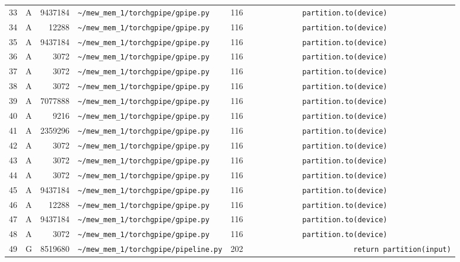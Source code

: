 \documentclass{article}
\begin{document}
\begin{longtable}{r l r p{6.5cm} r p{7.0cm}}
33 & A & 9437184 & \lstinline|~/mew_mem_1/torchgpipe/gpipe.py| & 116 & \lstinline|            partition.to(device)| \\
34 & A & 12288 & \lstinline|~/mew_mem_1/torchgpipe/gpipe.py| & 116 & \lstinline|            partition.to(device)| \\
35 & A & 9437184 & \lstinline|~/mew_mem_1/torchgpipe/gpipe.py| & 116 & \lstinline|            partition.to(device)| \\
36 & A & 3072 & \lstinline|~/mew_mem_1/torchgpipe/gpipe.py| & 116 & \lstinline|            partition.to(device)| \\
37 & A & 3072 & \lstinline|~/mew_mem_1/torchgpipe/gpipe.py| & 116 & \lstinline|            partition.to(device)| \\
38 & A & 3072 & \lstinline|~/mew_mem_1/torchgpipe/gpipe.py| & 116 & \lstinline|            partition.to(device)| \\
39 & A & 7077888 & \lstinline|~/mew_mem_1/torchgpipe/gpipe.py| & 116 & \lstinline|            partition.to(device)| \\
40 & A & 9216 & \lstinline|~/mew_mem_1/torchgpipe/gpipe.py| & 116 & \lstinline|            partition.to(device)| \\
41 & A & 2359296 & \lstinline|~/mew_mem_1/torchgpipe/gpipe.py| & 116 & \lstinline|            partition.to(device)| \\
42 & A & 3072 & \lstinline|~/mew_mem_1/torchgpipe/gpipe.py| & 116 & \lstinline|            partition.to(device)| \\
43 & A & 3072 & \lstinline|~/mew_mem_1/torchgpipe/gpipe.py| & 116 & \lstinline|            partition.to(device)| \\
44 & A & 3072 & \lstinline|~/mew_mem_1/torchgpipe/gpipe.py| & 116 & \lstinline|            partition.to(device)| \\
45 & A & 9437184 & \lstinline|~/mew_mem_1/torchgpipe/gpipe.py| & 116 & \lstinline|            partition.to(device)| \\
46 & A & 12288 & \lstinline|~/mew_mem_1/torchgpipe/gpipe.py| & 116 & \lstinline|            partition.to(device)| \\
47 & A & 9437184 & \lstinline|~/mew_mem_1/torchgpipe/gpipe.py| & 116 & \lstinline|            partition.to(device)| \\
48 & A & 3072 & \lstinline|~/mew_mem_1/torchgpipe/gpipe.py| & 116 & \lstinline|            partition.to(device)| \\
49 & G & 8519680 & \lstinline|~/mew_mem_1/torchgpipe/pipeline.py| & 202 & \lstinline|                        return partition(input)| \\

\end{longtable}
\end{document}
